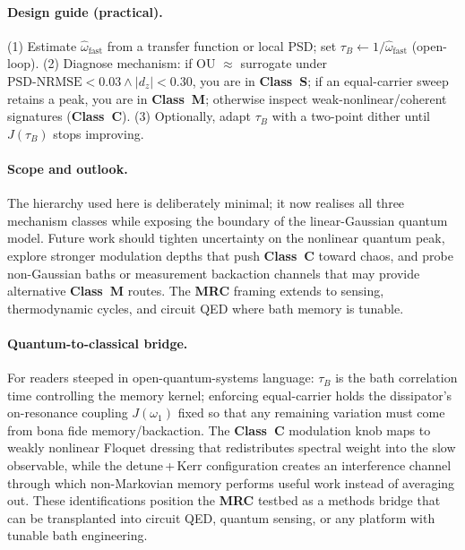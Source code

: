 \documentclass[11pt,letterpaper]{article}
\DeclareRobustCommand{\mrc}{\textbf{MRC}\xspace}
\DeclareRobustCommand{\classS}{\textbf{Class~S}\xspace}
\DeclareRobustCommand{\classC}{\textbf{Class~C}\xspace}
\DeclareRobustCommand{\classM}{\textbf{Class~M}\xspace}
\DeclareRobustCommand{\GatePSD}{\ensuremath{\text{PSD-NRMSE}<0.03}\xspace}
\DeclareRobustCommand{\GateDZ}{\ensuremath{\lvert d_z\rvert<0.30}\xspace}
\DeclareRobustCommand{\GateEQ}{\ensuremath{\GatePSD \wedge \GateDZ}\xspace}
\begin{document}
\paragraph*{Design guide (practical).}
(1) Estimate $\hat{\omega}_{\mathrm{fast}}$ from a transfer function or local PSD; set $\tau_B\leftarrow 1/\hat{\omega}_{\mathrm{fast}}$ (open-loop).
(2) Diagnose mechanism: if OU $\approx$ surrogate under \GateEQ, you are in \classS; if an equal-carrier sweep retains a peak, you are in \classM; otherwise inspect weak-nonlinear/coherent signatures (\classC).
(3) Optionally, adapt $\tau_B$ with a two-point dither until $J(\tau_B)$ stops improving.

\paragraph*{Scope and outlook.}
The hierarchy used here is deliberately minimal; it now realises all three mechanism classes while exposing the boundary of the linear-Gaussian quantum model. Future work should tighten uncertainty on the nonlinear quantum peak, explore stronger modulation depths that push \classC{} toward chaos, and probe non-Gaussian baths or measurement backaction channels that may provide alternative \classM{} routes. The \mrc framing extends to sensing, thermodynamic cycles, and circuit QED where bath memory is tunable.

\paragraph*{Quantum-to-classical bridge.}
For readers steeped in open-quantum-systems language: $\tau_B$ is the bath correlation time controlling the memory kernel; enforcing equal-carrier holds the dissipator's on-resonance coupling $J(\omega_1)$ fixed so that any remaining variation must come from bona fide memory/backaction. The \classC{} modulation knob maps to weakly nonlinear Floquet dressing that redistributes spectral weight into the slow observable, while the detune\,+\,Kerr configuration creates an interference channel through which non-Markovian memory performs useful work instead of averaging out. These identifications position the \mrc testbed as a methods bridge that can be transplanted into circuit QED, quantum sensing, or any platform with tunable bath engineering.
\end{document}
